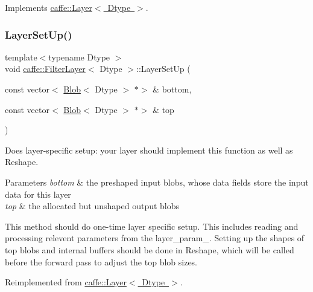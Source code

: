 Implements \mbox{\hyperlink{classcaffe_1_1_layer_a576ac6a60b1e99fe383831f52a6cea77}{caffe\+::\+Layer$<$ Dtype $>$}}.

\mbox{\label{classcaffe_1_1_filter_layer_a26a302fd9629af812e7d0714db79bb53}} 
\subsubsection{\texorpdfstring{Layer\+Set\+Up()}{LayerSetUp()}\hspace{0.1cm}{\footnotesize\ttfamily [1/2]}}
{\footnotesize\ttfamily template$<$typename Dtype $>$ \\
void \mbox{\hyperlink{classcaffe_1_1_filter_layer}{caffe\+::\+Filter\+Layer}}$<$ Dtype $>$\+::Layer\+Set\+Up (\begin{DoxyParamCaption}\item[{const vector$<$ \mbox{\hyperlink{classcaffe_1_1_blob}{Blob}}$<$ Dtype $>$ $\ast$$>$ \&}]{bottom,  }\item[{const vector$<$ \mbox{\hyperlink{classcaffe_1_1_blob}{Blob}}$<$ Dtype $>$ $\ast$$>$ \&}]{top }\end{DoxyParamCaption})\hspace{0.3cm}{\ttfamily [virtual]}}



Does layer-\/specific setup\+: your layer should implement this function as well as Reshape. 


\begin{DoxyParams}{Parameters}
{\em bottom} & the preshaped input blobs, whose data fields store the input data for this layer \\
\hline
{\em top} & the allocated but unshaped output blobs\\
\hline
\end{DoxyParams}
This method should do one-\/time layer specific setup. This includes reading and processing relevent parameters from the {\ttfamily layer\+\_\+param\+\_\+}. Setting up the shapes of top blobs and internal buffers should be done in {\ttfamily Reshape}, which will be called before the forward pass to adjust the top blob sizes. 

Reimplemented from \mbox{\hyperlink{classcaffe_1_1_layer_a481323a3e0972c682787f2137468c29f}{caffe\+::\+Layer$<$ Dtype $>$}}.

